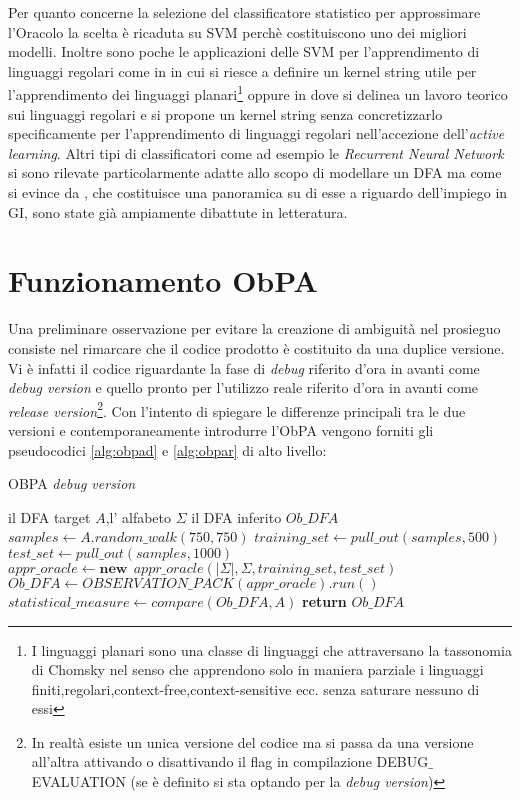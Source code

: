 Per quanto concerne la selezione del classificatore statistico per approssimare l'Oracolo la scelta è ricaduta su \ac{SVM} perchè costituiscono uno dei migliori modelli. Inoltre sono poche le applicazioni delle \ac{SVM} per l'apprendimento di linguaggi regolari come in \cite{Clark11}\cite{Clark06}  in cui si riesce a definire un kernel string utile per l'apprendimento dei linguaggi planari\footnote{I linguaggi planari sono una classe di linguaggi che attraversano la tassonomia di Chomsky nel senso che apprendono solo in maniera parziale i linguaggi finiti,regolari,context-free,context-sensitive ecc. senza saturare nessuno di essi}  oppure in \cite{Kontorovich09} dove si delinea un lavoro teorico sui linguaggi regolari e si propone un kernel string senza concretizzarlo specificamente per l'apprendimento di linguaggi regolari nell'accezione dell'\textit{active learning}. Altri tipi di classificatori come ad esempio le \textit{Recurrent Neural Network} si sono rilevate particolarmente adatte allo scopo di modellare un \ac{DFA} ma come si evince da \cite{Forcada02}, che costituisce una panoramica su di esse a riguardo dell'impiego in  \ac{GI}, sono state già ampiamente dibattute in letteratura.

\section{Funzionamento ObPA}
Una preliminare osservazione per evitare la creazione di ambiguità nel prosieguo consiste nel rimarcare che il codice prodotto è costituito da una duplice versione. Vi è infatti il codice riguardante la fase di \textit{debug} riferito d'ora in avanti come \textit{debug version} e quello pronto per l'utilizzo reale riferito d'ora in avanti come \textit{release version}\footnote{In realtà esiste un unica versione del codice ma si passa da una versione all'altra attivando o disattivando il flag in compilazione DEBUG$\_$EVALUATION (se è definito si sta optando per la \textit{debug version})}.  Con l'intento di spiegare le differenze principali tra le due versioni e contemporaneamente introdurre l'\ac{ObPA} vengono forniti gli pseudocodici \ref{alg:obpad} e \ref{alg:obpar} di alto livello:

\begin{algorithm}
\caption{OBPA \textit{debug version}}\label{alg:obpad}
\begin{algorithmic}[1]
\Statex
\Input il \ac{DFA} target $A$,l' alfabeto $\Sigma$ 
\Output il \ac{DFA} inferito $Ob\_DFA$
\State $samples \gets A.random\_walk(750,750)$
\State $training\_set \gets pull\_out(samples,500)$
\State $test\_set \gets pull\_out(samples,1000)$
\State $appr\_oracle \gets \textbf{new}\:\: appr\_oracle(|\Sigma|,\Sigma,training\_set,test\_set)$
\State $Ob\_DFA \gets OBSERVATION\_PACK(appr\_oracle).run()$
\State $statistical\_measure \gets compare(Ob\_DFA , A)$
 \State \textbf{return} $Ob\_DFA$
     
\end{algorithmic}
\end{algorithm}




